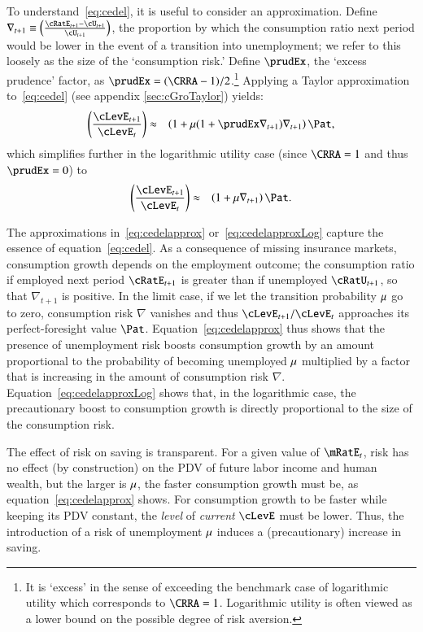 \documentclass[titlepage,abstract]{\econtex}\newcommand{\texname}{ctDiscrete}
\begin{document}
To understand~\eqref{eq:cedel}, it is useful to consider an
approximation.  Define $\nabla_{t+1} \equiv
\left(\frac{\cRatE_{t+1}-\cU_{t+1}}{\cU_{t+1}}\right)$, the proportion
by which the consumption ratio next period would be lower in the event of a
transition into unemployment; we refer to this loosely as the size of
the `consumption risk.' Define $\prudEx$, the `excess prudence'
factor, as $\prudEx = (\CRRA-1)/2$.\footnote{It is `excess' in the sense of exceeding the benchmark case of logarithmic utility which corresponds to $\CRRA=1$.  Logarithmic utility is often viewed as a lower bound on the possible degree of risk aversion.}
Applying a Taylor approximation to~\eqref{eq:cedel} (see appendix \ref{sec:cGroTaylor}) yields:
\begin{eqnarray}
  \left(\frac{\cLevE_{t+1}}{\cLevE_{t}}\right) & \approx & \left(1+ \urate (1+\prudEx\nabla _{t+1})\nabla _{t+1}\right) {\Pat}
\label{eq:cedelapprox}
,
\end{eqnarray}
which simplifies further in the logarithmic utility case (since $\CRRA = 1$ and thus $\prudEx = 0$) to
\begin{eqnarray}
  \left(\frac{\cLevE_{t+1}}{\cLevE_{t}}\right) & \approx & \left(1+ \urate \nabla _{t+1}\right) {\Pat}
\label{eq:cedelapproxLog}
.
\end{eqnarray}

The approximations in~\eqref{eq:cedelapprox} or~\eqref{eq:cedelapproxLog} capture the essence of equation~\eqref{eq:cedel}. As a consequence of missing insurance markets, consumption growth depends on the employment outcome; the consumption ratio if employed next
period $\cRatE_{t+1}$ is greater than if unemployed 
$\cRatU_{t+1}$, so that $\nabla _{t+1}$ is positive.
In the limit case, if we let the transition probability $\mu$ go to zero, consumption risk $\nabla$ vanishes and thus $\cLevE_{t+1}/\cLevE_{t}$ approaches its perfect-foresight value ${\Pat}$. Equation~\eqref{eq:cedelapprox} thus shows that the presence of unemployment risk boosts consumption growth by an amount proportional to the probability of becoming unemployed $\mu$ multiplied by a factor that is increasing in the amount of consumption risk $\nabla$. Equation~\eqref{eq:cedelapproxLog}
shows that, in the logarithmic case, the precautionary boost to consumption growth is directly proportional to the size of the consumption risk.

The effect of risk on saving is transparent. For a given value of $\mRatE_{t}$, risk has no effect (by construction) on the PDV of future labor income and human wealth, but the larger is $\mu$, the faster consumption growth must be, as equation~\eqref{eq:cedelapprox} shows.  For consumption growth to be faster while keeping its PDV constant, the \textit{level} of \textit{current} $\cLevE$ must be lower.  Thus, the introduction of a risk of unemployment $\mu$ induces a (precautionary) increase in saving.
\end{document}
